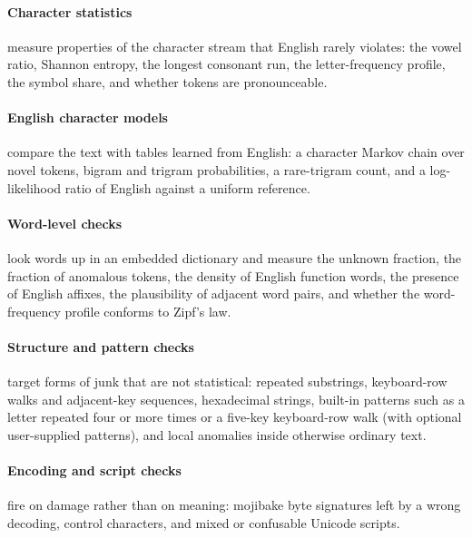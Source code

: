 \documentclass[10pt,twocolumn]{article}
\begin{document}
\begin{table}[t]
\centering
\small
\caption{Strategy families in pygarble. Counts sum to \nstrategies{}.}
\label{tab:families}

\end{table}

\paragraph{Character statistics} measure properties of the character
stream that English rarely violates: the vowel ratio, Shannon entropy,
the longest consonant run, the letter-frequency profile, the symbol
share, and whether tokens are pronounceable.

\paragraph{English character models} compare the text with tables
learned from English: a character Markov chain over novel tokens, bigram
and trigram probabilities, a rare-trigram count, and a log-likelihood
ratio of English against a uniform reference.

\paragraph{Word-level checks} look words up in an embedded dictionary
and measure the unknown fraction, the fraction of anomalous tokens, the
density of English function words, the presence of English affixes, the
plausibility of adjacent word pairs, and whether the word-frequency
profile conforms to Zipf's law.

\paragraph{Structure and pattern checks} target forms of junk that are
not statistical: repeated substrings, keyboard-row walks and adjacent-key
sequences, hexadecimal strings, built-in patterns such as a letter
repeated four or more times or a five-key keyboard-row walk (with
optional user-supplied patterns), and local anomalies inside otherwise
ordinary text.

\paragraph{Encoding and script checks} fire on damage rather than on
meaning: mojibake byte signatures left by a wrong decoding, control
characters, and mixed or confusable Unicode scripts.
\end{document}
